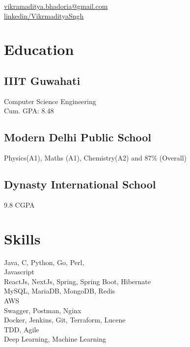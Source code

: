 \documentclass[]{hieudo-build}
\begin{document}
%
%
{
	\faEnvelope \href{mailto:vikramaditya.bhadoria@gmail.com}{ vikramaditya.bhadoria@gmail.com} \\
	\faLinkedinSquare \href{https://www.linkedin.com/in/VikramadityaSngh}{ linkedin/VikrmadityaSngh}
}
    
%
%
\begin{minipage}[t]{0.34\textwidth} 

\section{Education} 

\subsection{IIIT Guwahati}
Computer Science Engineering \\
Cum. GPA: 8.48\\
\sectionsep

\subsection{Modern Delhi Public School}
Physics(A1), Maths (A1), Chemistry(A2) and 87\% (Overall)\\
\sectionsep

\subsection{Dynasty International School}
9.8 CGPA
\sectionsep

\section{Skills}
Java, C, Python, Go, Perl,  \\ 
Javascript \\
ReactJs, NextJs, Spring, Spring Boot, Hibernate \\
MySQL, MariaDB, MongoDB, Redis \\
AWS \\
Swagger, Postman, Nginx \\
Docker, Jenkins, Git, Terraform, Lucene \\
TDD, Agile \\
Deep Learning, Machine Learning \\


\end{minipage}
\end{document}
